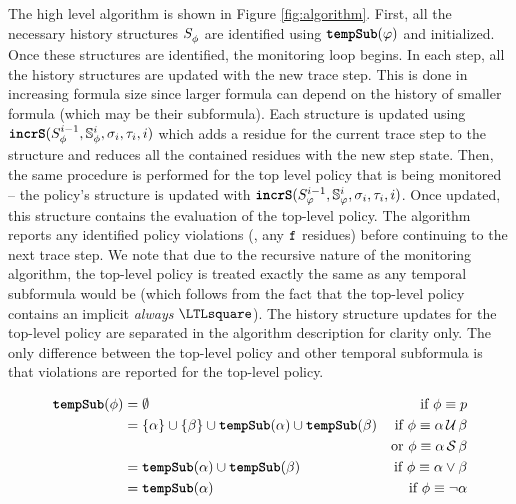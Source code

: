 The high level algorithm \monitor is shown in Figure \ref{fig:algorithm}. 
%
First, all the necessary history structures $\histst[\policyv]{ }$ are identified using $\tempSub(\policy)$ and initialized. 
Once these structures are identified, the monitoring loop begins.
%
In each step, all the history structures are updated with the new trace step. 
This is done in increasing formula size since larger formula can depend on the history of smaller formula (which may be their subformula).
%
Each structure is updated using $\incrS(\histst[\policyv]{i-1},\histSt[\policyv]{i}, \sigma_i, \tau_i, i)$ which adds a residue for the current trace step to the structure and reduces all the contained residues with the new step state. 
Then, the same procedure is performed for the top level policy that is being monitored -- the policy's structure is updated with $\incrS(\histst{i-1},\histSt{i},\sigma_i,\tau_i, i)$.
Once updated, this structure contains the evaluation of the top-level policy. The algorithm reports any identified policy violations (\ie, any $\false$ residues) before continuing to the next trace step.
%
We note that due to the recursive nature of the monitoring algorithm, the top-level policy is treated exactly the same as any temporal subformula would be (which follows from the fact that the top-level policy contains an implicit \emph{always} $\henceforth$). 
The history structure updates for the top-level policy are separated in the algorithm description for clarity only.
The only difference between the top-level policy and other temporal subformula is that violations are reported for the top-level policy. 

\begin{figure}
\begin{align}
\tempSub(\phi) &= \emptyset &\text{if } \phi \equiv p \\
			   &= \{\alpha\} \cup \{\beta\} \cup \tempSub(\alpha) \cup \tempSub(\beta) &\text{if } \phi \equiv \alpha \until \beta \\
			   &				&\text{or } \phi \equiv \alpha \since \beta \\
			   &= \tempSub(\alpha) \cup \tempSub(\beta) &\text{if } \phi \equiv \alpha \vee \beta \\
			   &= \tempSub(\alpha) &\text{if } \phi \equiv \neg \alpha \\	
\end{align}
\end{figure}

